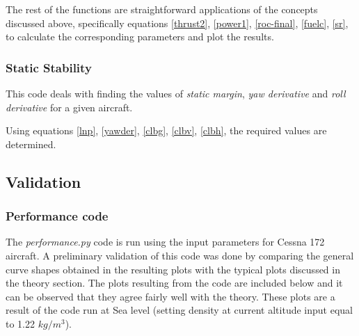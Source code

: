 \documentclass[letterpaper,12pt]{article}
\begin{document}
The rest of the functions are straightforward applications of the concepts discussed above, specifically equations \ref{thrust2}, \ref{power1}, \ref{roc-final}, \ref{fuelc}, \ref{sr}, to calculate the corresponding parameters and plot the results.



\subsubsection{Static Stability}
This code deals with finding the values of \textit{static margin}, \textit{yaw derivative} and \textit{roll derivative} for a given aircraft. 

Using equations \ref{lnp}, \ref{yawder}, \ref{clbg}, \ref{clbv}, \ref{clbh}, the required values are determined.


\subsection{Validation}

\subsubsection{Performance code}

The \textit{performance.py} code is run using the input parameters for Cessna 172 aircraft. A preliminary validation of this code was done by comparing the general curve shapes obtained in the resulting plots with the typical plots discussed in the theory section. The plots resulting from the code are included below and it can be observed that they agree fairly well with the theory. These plots are a result of the code run at Sea level (setting density at current altitude input equal to 1.22 $kg/m^3$).
\end{document}

